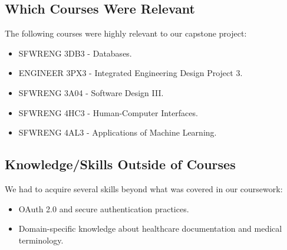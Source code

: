 \documentclass{article}
\begin{document}
 \subsection{Which Courses Were Relevant}
 
 The following courses were highly relevant to our capstone project:
 \begin{itemize}
     \item SFWRENG 3DB3 - Databases.
     \item ENGINEER 3PX3 - Integrated Engineering Design Project 3.
     \item SFWRENG 3A04 - Software Design III.
     \item SFWRENG 4HC3 - Human-Computer Interfaces.
     \item SFWRENG 4AL3 - Applications of Machine Learning.
 \end{itemize}
 
 \subsection{Knowledge/Skills Outside of Courses}
 
 We had to acquire several skills beyond what was covered in our coursework:
 \begin{itemize}
     \item OAuth 2.0 and secure authentication practices.
     \item Domain-specific knowledge about healthcare documentation and medical terminology.
 \end{itemize}
\end{document}
